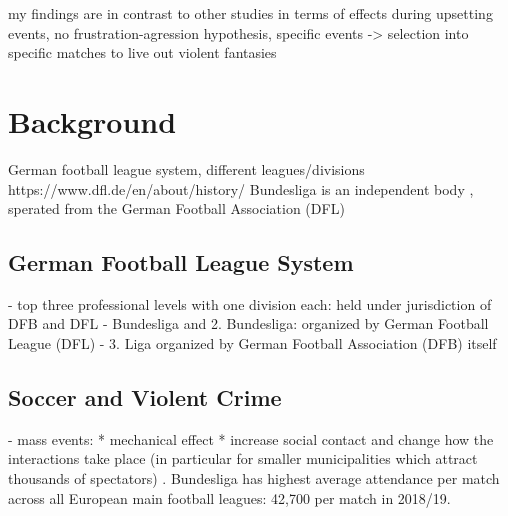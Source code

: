\documentclass[11pt, a4paper]{article} %
\begin{document}
my findings are in contrast to other studies in terms of effects during upsetting events, no frustration-agression hypothesis, specific events -> selection into specific matches to live out violent fantasies

\newpage
\section{Background}\label{sec_soc_ext:background}

German football league system, different leagues/divisions
https://www.dfl.de/en/about/history/
Bundesliga is an independent body , sperated from the German Football Association (DFL)





\subsection{German Football League System}
- top three professional levels with one division each: held under jurisdiction of DFB and DFL
- Bundesliga and 2. Bundesliga: organized by German Football League (DFL)
- 3. Liga organized by German Football Association (DFB) itself



\subsection{Soccer and Violent Crime}

- mass events: 
	* mechanical effect
	* increase social contact and change how the interactions take place (in particular for smaller municipalities which attract thousands of spectators) \cite{lindo2018college}. Bundesliga has highest average attendance per match across all European main football leagues\citep{wicker2017effect}: 42,700 per match in 2018/19.
\end{document}

